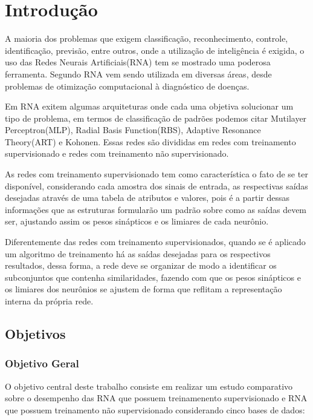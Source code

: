 \chapter{Introdução}
\label{cap:introducao}
A maioria dos problemas que exigem classificação, reconhecimento, controle, identificação, previsão, entre outros, onde a utilização de inteligência é exigida, o uso das Redes Neurais Artificiais(RNA) tem se mostrado uma poderosa ferramenta. Segundo  RNA vem sendo utilizada em diversas áreas, desde problemas de otimização computacional à diagnóstico de doenças. 

Em RNA exitem algumas arquiteturas onde cada uma objetiva solucionar um tipo de problema, em termos de classificação de padrões podemos citar Mutilayer Perceptron(MLP), Radial Basis Function(RBS), Adaptive Resonance Theory(ART) e Kohonen. Essas redes são divididas em redes com treinamento supervisionado e redes com treinamento não supervisionado.

 As redes com treinamento supervisionado tem como característica o fato de se ter disponível, considerando cada amostra dos sinais de entrada, as respectivas saídas desejadas através de uma tabela de atributos e valores, pois é a partir dessas informações que as estruturas formularão um padrão sobre como as saídas devem ser, ajustando assim os pesos sinápticos e os limiares de cada neurônio.
 
 Diferentemente das redes com treinamento supervisionados, quando se é aplicado um algoritmo de treinamento há as saídas desejadas para os respectivos resultados, dessa forma, a rede deve se organizar de modo a identificar os subconjuntos que contenha similaridades, fazendo com que os pesos sinápticos e os limiares dos neurônios se ajustem de forma que reflitam a representação interna da própria rede.


\section{Objetivos}
\label{sec:objetivos}

\subsection{Objetivo Geral}
\label{sec:objetivo-geral}

O objetivo central deste trabalho consiste em realizar um estudo comparativo sobre o desempenho das RNA que possuem treinamenento supervisionado e 	RNA que possuem treinamento não supervisionado considerando cinco bases de dados:

